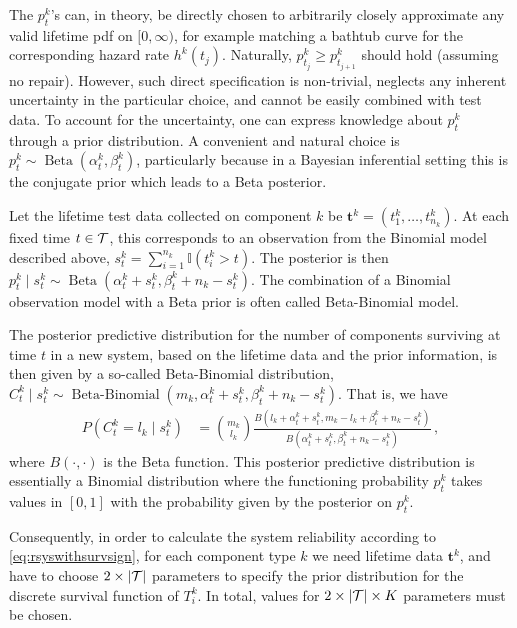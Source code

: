 \documentclass[12pt, a4paper]{elsarticle}
\newcommand{\bs}[1]{\boldsymbol{#1}}
\renewcommand{\vec}[1]{{\bs#1}}
\newcommand{\indic}{\mathbb{I}}
\newcommand{\be}{\operatorname{Beta}}
\newcommand{\bebin}{\operatorname{Beta-Binomial}}
\newcommand{\ptk}{p^k_t}
\begin{document}
The $\ptk$'s can, in theory, be directly chosen to arbitrarily closely approximate any valid lifetime pdf on
$[0,\infty)$, for example matching a bathtub curve for the corresponding hazard rate $h^k(t_j)$.
Naturally, $p^k_{t_j} \ge p^k_{t_{j+1}}$ should hold (assuming no repair).
However, such direct specification is non-trivial, neglects any inherent uncertainty in the particular choice, and cannot be 
easily combined with test data.
To account for the uncertainty, one can express knowledge about $\ptk$ through a prior distribution.
A convenient and natural choice is $\ptk \sim \be(\alpha^k_t, \beta^k_t)$, particularly because in a Bayesian inferential
setting this is the conjugate prior which leads to a Beta posterior.

Let the lifetime test data collected on component $k$ be $\vec{t}^k = (t^k_1, \ldots, t^k_{n_k})$.
At each fixed time $t \in {\cal T}$, this corresponds to an observation from the Binomial model described above,
$s^k_t = \sum_{i=1}^{n_k} \indic(t^k_i > t)$.
The posterior is then $\ptk \mid s^k_t \sim \be(\alpha^k_t + s^k_t, \beta^k_t + n_k - s^k_t)$.
The combination of a Binomial observation model with a Beta prior is often called Beta-Binomial model.

The posterior predictive distribution for the number of components surviving at time $t$
in a new system, based on the lifetime data and the prior information,
is then given by a so-called Beta-Binomial distribution,
$C^k_t \mid s^k_t \sim \bebin(m_k, \alpha^k_t + s^k_t, \beta^k_t + n_k - s^k_t)$.
That is, we have
\begin{align*}
P(C^k_t = l_k \mid s^k_t) &= {m_k \choose l_k} \frac{B(l_k + \alpha^k_t + s^k_t, m_k - l_k + \beta^k_t + n_k - s^k_t)}
                                                    {B(\alpha^k_t + s^k_t, \beta^k_t + n_k - s^k_t)} \,,
\end{align*}
where $B(\cdot, \cdot)$ is the Beta function.
This posterior predictive distribution is essentially a Binomial distribution
where the functioning probability $\ptk$ takes values in $[0,1]$
with the probability given by the posterior on $\ptk$.

Consequently, in order to calculate the system reliability according to \eqref{eq:rsyswithsurvsign},
for each component type $k$
we need lifetime data $\vec{t}^k$,
and have to choose $2 \times |{\cal T}|$ parameters
to specify the prior distribution for the discrete survival function of $T^k_i$.
In total, values for $2 \times |{\cal T}| \times K$ parameters must be chosen.
\end{document}

